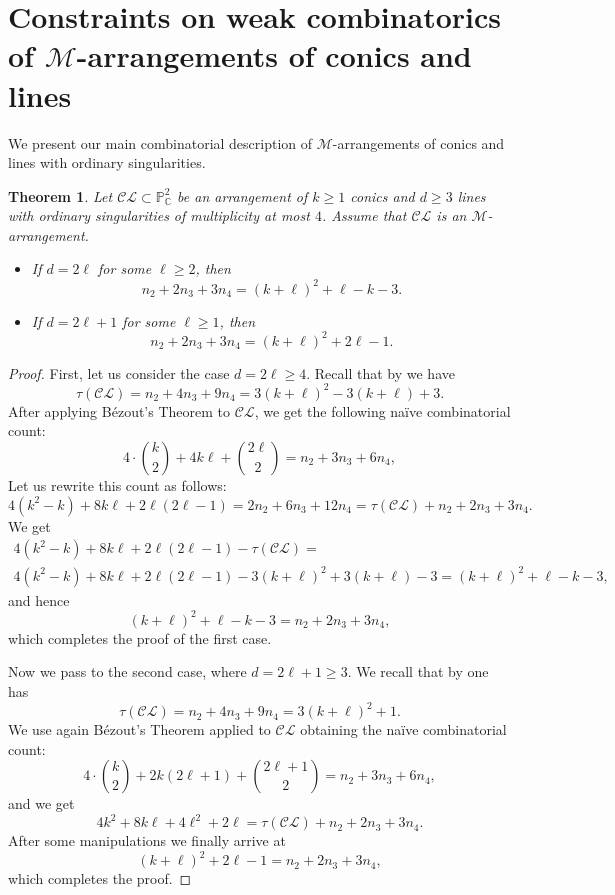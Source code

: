\documentclass[11pt]{article}
\theoremstyle{plain}
\newtheorem{theorem}{Theorem}[section]
\theoremstyle{definition}
\theoremstyle{remark}
\begin{document}
\section[Constraints on weak combinatorics of M-arrangements of conics and lines]{Constraints on weak combinatorics of $\mathscr{M}$-arrangements of conics and lines}
We present our main combinatorial description of $\mathscr{M}$-arrangements of conics and lines with ordinary singularities.
\begin{theorem}
\label{char}
Let $\mathcal{CL} \subset \mathbb{P}^{2}_{\mathbb{C}}$ be an arrangement of $k\geq 1$ conics and $d\geq 3$ lines with ordinary singularities of multiplicity at most $4$. Assume that $\mathcal{CL}$ is an $\mathscr{M}$-arrangement.
\begin{itemize}
    \item[(i)] If $d=2\ell$ for some $\ell\geq 2$, then 
    $$n_{2}+2n_{3}+3n_{4} = (k+\ell)^{2}+\ell-k-3.$$
    \item[(ii)] If $d=2\ell+1$ for some $\ell \geq 1$, then
    $$n_{2}+2n_{3}+3n_{4} = (k+\ell)^{2}+2\ell - 1.$$
\end{itemize}
\end{theorem}
\begin{proof}
First, let us consider the case $d=2\ell \geq 4$. Recall that by \cite[Theorem 4.3]{JanLes} we have
$$\tau(\mathcal{CL})=n_{2}+4n_{3}+9n_{4}=3(k+\ell)^2 - 3(k+\ell) +3.$$ 
After applying B\'ezout's Theorem to $\mathcal{CL}$, we get the following na\"ive combinatorial count:
\begin{equation}
\label{naive1}
4\cdot \binom{k}{2} + 4k\ell + \binom{2\ell}{2} = n_{2} + 3n_{3} + 6n_{4},
\end{equation}
Let us rewrite this count as follows:
$$4(k^{2}-k) +8k\ell + 2\ell(2\ell-1)= 2n_{2}+6n_{3}+12n_{4} = \tau(\mathcal{CL}) + n_{2}+2n_{3}+3n_{4}.$$
We get
\begin{multline*}
4(k^{2}-k) +8k\ell + 2\ell(2\ell-1) - \tau(\mathcal{CL}) = \\ 4(k^{2}-k) +8k\ell + 2\ell(2\ell-1) - 3(k+\ell)^2 + 3(k+\ell) -3  = (k+\ell)^{2}+\ell - k - 3,
\end{multline*}
and hence
$$(k+\ell)^{2}+\ell - k - 3= n_{2}+2n_{3}+3n_{4},$$
which completes the proof of the first case.

\noindent
Now we pass to the second case, where $d=2\ell + 1 \geq 3$. We recall that by \cite[Theorem 4.8]{JanLes} one has
$$\tau(\mathcal{CL})=n_{2}+4n_{3}+9n_{4}=3(k+\ell)^2 + 1.$$ 
We use again B\'ezout's Theorem applied to $\mathcal{CL}$ obtaining the na\"ive combinatorial count:
\begin{equation}
4\cdot \binom{k}{2} + 2k(2\ell+1) + \binom{2\ell+1}{2} = n_{2} + 3n_{3} + 6n_{4},
\end{equation}
and we get
$$4k^{2}+8k\ell+4\ell^{2}+2\ell = \tau(\mathcal{CL}) + n_{2}+2n_{3}+3n_{4}.$$
After some manipulations we finally arrive at
$$(k+\ell)^{2}+2\ell - 1 = n_{2}+2n_{3}+3n_{4},$$
which completes the proof.
\end{proof}
\end{document}
